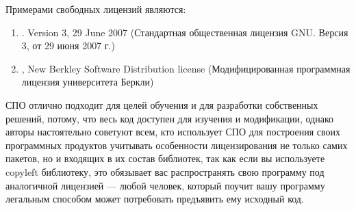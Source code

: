 Примерами свободных лицензий являются:
\begin{enumerate}
    \item {}. Version 3, 29 June 2007 (Стандартная общественная лицензия GNU. Версия 3, от 29 июня 2007 г.)
    \item {}, New Berkley Software Distribution license (Модифицированная программная лицензия университета Беркли)
\end{enumerate}

СПО отлично подходит для целей обучения и для разработки собственных решений, потому, что весь 
код доступен для изучения и модификации, однако авторы настоятельно советуют всем, кто использует 
СПО для построения своих программных продуктов учитывать особенности лицензирования не только самих 
пакетов, но и входящих в их состав библиотек, так как если вы используете copyleft библиотеку, 
это обязывает вас распространять свою программу под аналогичной лицензией --- любой человек, который 
поучит вашу программу легальным способом может потребовать предъявить ему исходный код.

